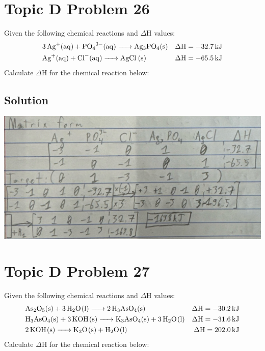 \documentclass[10pt]{article}
\begin{document}
    \pagebreak
    \section{Topic D Problem 26}
        Given the following chemical reactions and $\Delta$H values:
        \begin{align*}
            &\ce{3 Ag+(aq) + PO4^3-(aq) -> Ag3PO4(s)}   &\rm \Delta H = -32.7\,\unit{\kilo\joule}\\
            &\ce{Ag+(aq) + Cl-(aq) -> AgCl (s)}         &\rm \Delta H = -65.5\,\unit{\kilo\joule}
        \end{align*}
        Calculate $\Delta$H for the chemical reaction below:
        \begin{center}
        \end{center}

        \subsection{Solution}
            \begin{center}
                \includegraphics[width=\textwidth]{Answers Images/D26.jpg}
            \end{center}



    \pagebreak
    \section{Topic D Problem 27}
        Given the following chemical reactions and $\Delta$H values:
        \begin{align*}
            &\ce{As2O5(s) + 3 H2O(l) -> 2 H3AsO4(s)}            &\rm \Delta H = -30.2\,\unit{\kilo\joule}\\
            &\ce{H3AsO4(s) + 3 KOH(s) -> K3AsO4(s) + 3 H2O(l)}  &\rm \Delta H = -31.6\,\unit{\kilo\joule}\\
            &\ce{2 KOH(s) -> K2O(s) + H2O(l)}                   &\rm \Delta H = 202.0\,\unit{\kilo\joule}
        \end{align*}
        Calculate $\Delta$H for the chemical reaction below:
        \begin{center}
        \end{center}
\end{document}
